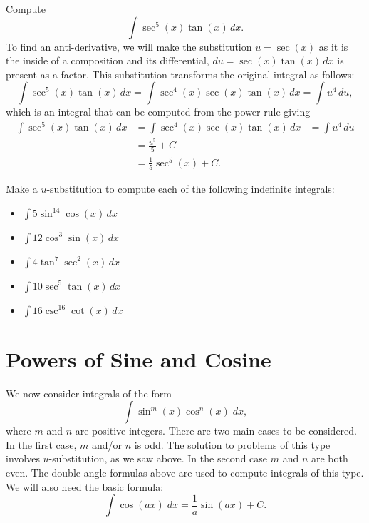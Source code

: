 \documentclass{ximera}
\begin{document}
\begin{example}
Compute
\[
\int \sec^5(x) \tan(x) \, dx.
\]
To find an anti-derivative, we will make the substitution $u = \sec(x)$ as it is the inside of a composition
and its differential, $du = \sec(x)\tan(x) \, dx$ is present as a factor. 
This substitution transforms the original integral as follows:
\[
\int \sec^5(x) \tan(x) \, dx = \int \sec^4(x) \sec(x) \tan(x) \, dx= \int u^4 \, du,
\]
which is an integral that can be computed from the power rule giving
\begin{align*}
\int \sec^5(x) \tan(x) \, dx &= \int \sec^4(x) \sec(x) \tan(x) \, dx
                             &= \int u^4 \, du\\
                             &= \frac{u^5}{5} + C\\
                             &= \frac15 \sec^5(x) + C.
\end{align*}

\end{example}

\begin{problem}
Make a $u$-substitution to compute each of the following indefinite integrals:
\begin{itemize}
\item $\displaystyle{\int 5\sin^{14}\cos(x) \, dx}$
\item $\displaystyle{\int 12\cos^{3}\sin(x) \, dx}$
\item $\displaystyle{\int 4\tan^{7}\sec^2(x) \, dx}$
\item $\displaystyle{\int 10 \sec^{5}\tan(x) \, dx}$
\item $\displaystyle{\int 16\csc^{16}\cot(x) \, dx}$
\end{itemize}
\end{problem}

\section{Powers of Sine and Cosine}
We now consider integrals of the form 
\[
\int \sin^m(x) \cos^n(x) \; dx,
\]
where $m$ and $n$ are positive integers.
There are two main cases to be considered.
In the first case, $m$ and/or $n$ is odd.
The solution to problems of this type involves $u$-substitution,
as we saw above.
In the second case $m$ and $n$ are both even. The double angle formulas above are used to 
compute integrals of this type. We will also need the basic formula:
\[
\int \cos(ax) \; dx = \frac{1}{a} \sin(ax) + C.
\]
\end{document}
